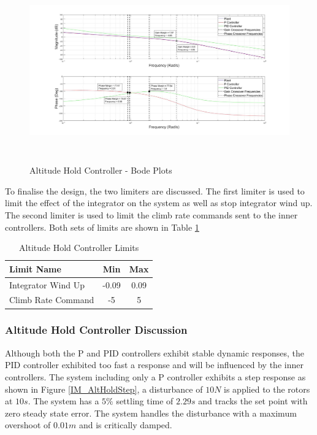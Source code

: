	 \begin{figure}[H]
	 	\centering
	 	\includegraphics[height = 7.9cm]{../Design/Matlab/Controllers/altitude_bode.jpg}
	 	\caption{Altitude Hold Controller -  Bode Plots}
	 	\label{IM_AltHoldBode}
	 \end{figure}
	 
	 To finalise the design, the two limiters are discussed. The first limiter is used to limit the effect of the integrator on the system as well as stop integrator wind up. The second limiter is used to limit the climb rate commands sent to the inner controllers. Both sets of limits are shown in Table \ref{tab:AltitudeControllerLimits}
	 
	 \begin{table}[!]
	 	\centering
	 	\begin{tabular}{l | c | c |}
	 		Limit Name 						& Min & Max\\
	 		\hline\hline
	 		Integrator Wind Up 				& -0.09 & 0.09 \\
	 		Climb Rate Command 		    	& -5 & 5 \\
	 	\end{tabular}
	 	\caption{Altitude Hold Controller Limits}
	 	\label{tab:AltitudeControllerLimits}
	 \end{table}
	 
		 \subsubsection{Altitude Hold Controller Discussion}
		 Although both the P and PID controllers exhibit stable dynamic responses, the PID controller exhibited too fast a response and will be influenced by the inner controllers. The system including only a P controller exhibits a step response as shown in Figure \ref{IM_AltHoldStep}, a disturbance of $10N$ is applied to the rotors at $10s$. The system has a $5\%$ settling time of $2.29s$ and tracks the set point with zero steady state error. The system handles the disturbance with a maximum overshoot of $0.01m$ and is critically damped.
		 
